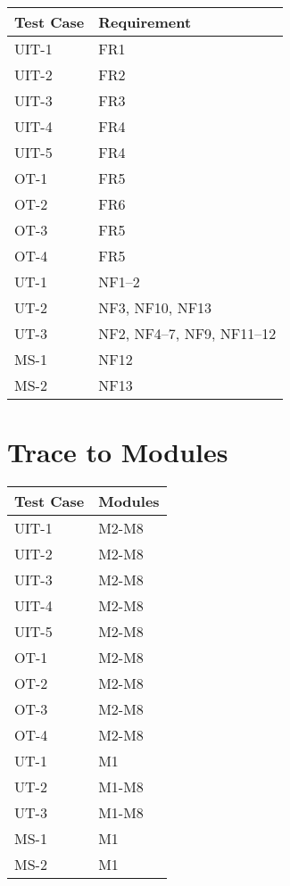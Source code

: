 \documentclass[12pt, titlepage]{article}
\begin{document}
\begin{table}[H]
  \begin{tabularx}{1.0\linewidth}[H]{ll}
    \toprule
    Test Case & Requirement \\
    \midrule
    UIT-1 & FR1 \\
    UIT-2 & FR2 \\
    UIT-3 & FR3 \\
    UIT-4 & FR4 \\
    UIT-5 & FR4 \\
    OT-1 & FR5 \\
    OT-2 & FR6 \\
    OT-3 & FR5 \\
    OT-4 & FR5 \\
    \midrule
    UT-1 & NF1--2 \\
    UT-2 & NF3, NF10, NF13 \\
    UT-3 & NF2, NF4--7, NF9, NF11--12 \\
    MS-1 & NF12\\
    MS-2 & NF13\\
    \bottomrule
  \end{tabularx}
\end{table}
		
\section{Trace to Modules}		

\begin{table}[H]
  \begin{tabularx}{1.0\linewidth}{ll}
    \toprule
    Test Case & Modules \\
    \midrule
    UIT-1 & M2-M8 \\
    UIT-2 & M2-M8 \\
    UIT-3 & M2-M8 \\
    UIT-4 & M2-M8 \\
    UIT-5 & M2-M8 \\
    OT-1 & M2-M8 \\
    OT-2 & M2-M8 \\
    OT-3 & M2-M8 \\
    OT-4 & M2-M8 \\
    \midrule
    UT-1 & M1 \\
    UT-2 & M1-M8 \\
    UT-3 & M1-M8 \\
    MS-1 & M1 \\
    MS-2 & M1 \\
    \bottomrule
  \end{tabularx}
\end{table}
\end{document}

